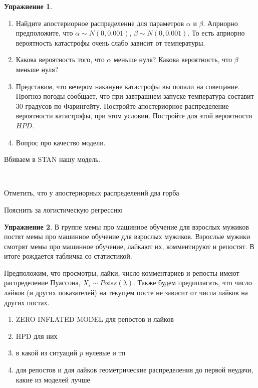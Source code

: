 \documentclass[12pt, a4paper, oneside]{extreport}
\theoremstyle{plain}              %
\theoremstyle{definition}         %
\newtheorem{problem}{\color{myblue} Упражнение}
\begin{document}
\begin{problem}
\begin{enumerate} 
	\item Найдите апостериорное распределение для параметров $\alpha$ и $\beta$.  Априорно предположите, что $\alpha \sim N(0, 0.001)$,  $\beta \sim N(0, 0.001)$. То есть априорно вероятность катастрофы очень слабо зависит от температуры.
	
	\item Какова вероятность того, что $\alpha$ меньше нуля? Какова вероятность, что $\beta$ меньше нуля? 
	
	\item Представим, что вечером накануне катастрофы вы попали на совещание. Прогноз погоды сообщает, что при завтрашнем запуске температура составит $30$ градусов по Фарингейту. Постройте апостериорное распределение вероятности катастрофы, при этом условии. Постройте для этой вероятности $HPD$. 
	
	\item Вопрос про качество модели. 
	
\end{enumerate}
	\begin{sol} 
	Вбиваем в STAN нашу модель. 
	
\begin{verbatim}


\end{verbatim}
		
		
		
		
	Отметить, что у апостериорных распределений два горба 

	Пояснить за логистическую регрессию 
		
	\end{sol} 
\end{problem}


\begin{problem}
	В группе мемы про машинное обучение для взрослых мужиков постят мемы про машинное обучение для взрослых мужиков. Взрослые мужики смотрят мемы про машинное обучение, лайкают их, комментируют и репостят. В итоге рождается табличка со статистикой.
	
	Предположим, что просмотры, лайки, число комментариев и репосты имеют распределение Пуассона, $X_i \sim Poiss(\lambda)$. Также будем предполагать, что число лайков (и других показателей) на текущем посте не зависит от числа лайков на других постах.
	
	\begin{enumerate}
		\item  ZERO INFLATED MODEL для репостов и лайков 
		\item  HPD для них 
		\item  в какой из ситуаций $p$ нулевые и  тп
		\item  для репостов и для лайков геометрические распределения до первой неудачи, какие из моделей лучше
	\end{enumerate}

	\begin{sol} 
		
	\end{sol} 
\end{problem}
\end{document}
